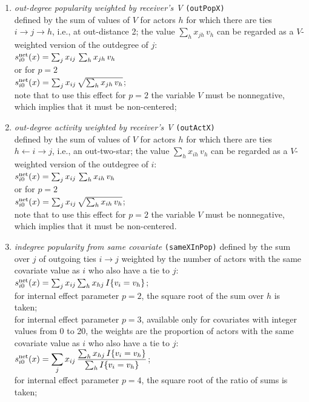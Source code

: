 \documentclass[a4paper,fleqn,11pt]{article}
\newcommand{\+}{\, + \,}
\newcommand{\vit}{\theenumi}
\begin{document}
\begin{enumerate}
 \item {\em out-degree popularity weighted by receiver's V }  \texttt{(outPopX)}\\
 defined by the sum of values of $V$ for actors $h$
 for which there are ties  $ i \rightarrow j \rightarrow h$,
 i.e., at out-distance 2;
 the value $\sum_h x_{jh}\,v_h$ can be regarded as a $V$-weighted
 version of the outdegree of $j$:\\
 $s^{\rm net}_{i\vit}(x) =  \sum_j x_{ij}\, \sum_h x_{jh}\,v_h  $ \\
 or for $p=2$ \\
   $s^{\rm net}_{i\vit}(x) =  \sum_j x_{ij}\, \sqrt{\sum_h x_{jh}\,v_h}   $;\\
 note that to use this effect for $p=2$ the variable $V$ must be nonnegative,
 which implies that it must be non-centered;

 \item {\em out-degree activity weighted by receiver's V }   \texttt{(outActX)}\\
 defined by the sum of values of $V$ for actors $h$
 for which there are ties  $h \leftarrow i \rightarrow j$,
 i.e., an out-two-star;
 the value $\sum_h x_{ih}\,v_h$ can be regarded as a $V$-weighted
 version of the outdegree of $i$:\\
 $s^{\rm net}_{i\vit}(x) =  \sum_j x_{ij}\, \sum_h x_{ih}\,v_h  $ \\
 or for $p=2$ \\
   $s^{\rm net}_{i\vit}(x) =  \sum_j x_{ij}\, \sqrt{\sum_h x_{ih}\,v_h}   $;\\
 note that to use this effect for $p=2$ the variable $V$ must be nonnegative,
 which implies that it must be non-centered.

 \item {\em indegree popularity from same covariate}
\texttt{(sameXInPop)} defined by the sum over $j$ of outgoing ties $i \rightarrow j$ weighted by the
number of actors with the same covariate value as $i$ who also have a tie to $j$:\\
 $s^{\rm net}_{i\vit}(x) = \sum_j x_{ij} \sum_h x_{hj}\, I\{v_i = v_h \} $;\\
 for internal effect parameter $p=2$, the square root of the sum over $h$ is taken;\\
 for internal effect parameter $p=3$, available only for
 covariates with integer values from 0 to 20, the weights are the
 proportion of actors with the same covariate value as $i$ who also have a tie to $j$:\\
 $\displaystyle s^{\rm net}_{i\vit}(x) = \sum_j x_{ij} \, \frac{\sum_h x_{hj}\, I\{v_i = v_h \}}
                {\sum_h I\{v_i = v_h \}} $;\\
 for internal effect parameter $p=4$, the square root of the ratio of sums is taken;


\end{enumerate}
\end{document}

